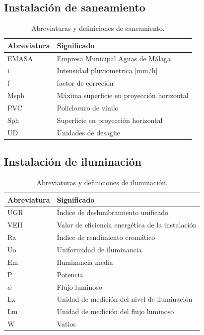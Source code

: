 \documentclass[../main.tex]{subfiles}
\begin{document}
\subsection{Instalación de saneamiento}
\begin{table}[H]
    \centering
    \begin{tabular}{l|l}
    Abreviatura & Significado \\ \hline
    EMASA & Empresa Municipal Aguas de Málaga \\ \hline
    i & Intensidad pluviometrica [mm/h] \\ \hline
    f & factor de correción \\ \hline
    Msph & Máxima superficie en proyección horizontal \\ \hline
    PVC & Policloruro de vinilo \\ \hline
    Sph & Superficie en proyección horizontal \\ \hline
    UD & Unidades de desagüe \\ \hline
    \end{tabular}
    \caption{Abreviaturas y definiciones de saneamiento.}
\end{table}



\subsection{Instalación de iluminación}
\begin{table}[H]
    \centering
    \begin{tabular}{l | l}
         Abreviatura & Significado \\ \hline
         UGR & Índice de deslumbramiento unificado \\ \hline
         VEII & Valor de eficiencia energética de la instalación \\ \hline
         Ra & Índice de rendimiento cromático \\ \hline
         Uo & Uniformidad de iluminancia \\ \hline
         Em & Iluminancia media \\ \hline
         P & Potencia \\ \hline
         $\phi$ & Flujo luminoso \\ \hline
         Lx & Unidad de medición del nivel de iluminación \\ \hline
         Lm & Unidad de medición del flujo luminoso \\ \hline
         W & Vatios
    \end{tabular}
    \caption{Abreviaturas y definiciones de iluminación.}
\end{table}
\end{document}
